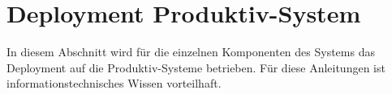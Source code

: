 \section{Deployment Produktiv-System}
In diesem Abschnitt wird für die einzelnen Komponenten des Systems das Deployment auf die Produktiv-Systeme betrieben. 
Für diese Anleitungen ist informationstechnisches Wissen vorteilhaft. 
